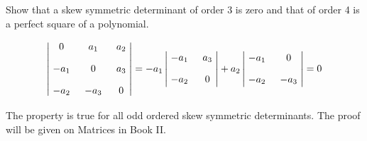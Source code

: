 \documentclass{amsbook}
\begin{document}
\begin{hEnumerateArabic}
    \item Show that a skew symmetric determinant of order 3 is zero and that of order 4 is a perfect square of a polynomial.
    \-
    \begin{hSolution}
        \begin{align*}
            \begin{vmatrix}
                \xymatrix @R=3mm @C=3mm {
                     0   & a_1  & a_2   \\
                    -a_1 & 0    & a_3   \\
                    -a_2 & -a_3 & 0
                }
            \end{vmatrix}
            = -a_1
            \begin{vmatrix}
                \xymatrix @R=3mm @C=3mm {
                    -a_1 & a_3  \\
                    -a_2 & 0
                }
            \end{vmatrix}
            + a_2
            \begin{vmatrix}
                \xymatrix @R=3mm @C=3mm {
                    -a_1 & 0    \\
                    -a_2 & -a_3
                }
            \end{vmatrix}
            = 0
        \end{align*}
        \par The property is true for all odd ordered skew symmetric determinants. The proof will be given on Matrices in Book II.
    \end{hSolution}
    \end{hEnumerateArabic}
\end{document}
